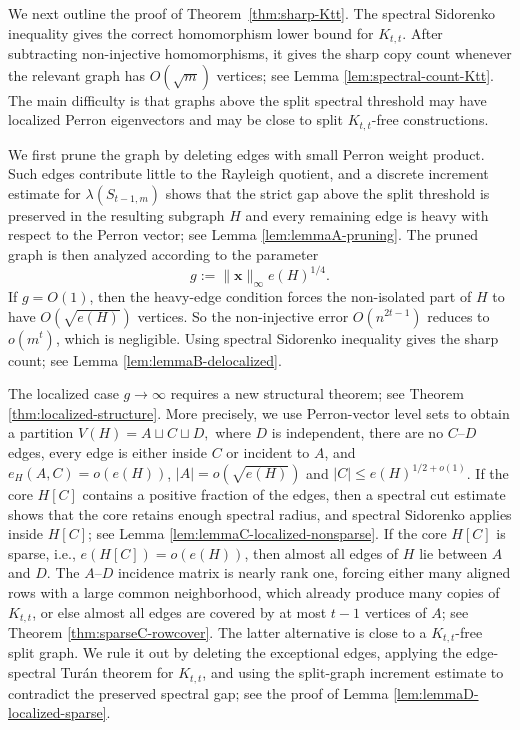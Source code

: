 \documentclass[11pt]{article}
\theoremstyle{definition}
\theoremstyle{plain}
\begin{document}
We next outline the proof of Theorem~\ref{thm:sharp-Ktt}.  The spectral
Sidorenko inequality gives the correct homomorphism lower bound for
\(K_{t,t}\).  After subtracting non-injective homomorphisms, it gives the
sharp copy count whenever the relevant graph has \(O(\sqrt m)\) vertices; see Lemma \ref{lem:spectral-count-Ktt}. 
The main difficulty is that graphs above the split spectral threshold may
have localized Perron eigenvectors and may be close to split
\(K_{t,t}\)-free constructions.

We first prune the graph by deleting edges with small Perron weight 
product.  Such edges contribute little to the Rayleigh quotient, and a
discrete increment estimate for \(\lambda(S_{t-1,m})\) shows that the
strict gap above the split threshold is preserved in the resulting subgraph \(H\) and every remaining edge is heavy with respect to the Perron vector; see Lemma \ref{lem:lemmaA-pruning}. The pruned graph is then analyzed according to the parameter 
\[
        g:=\|\bm{x}\|_\infty e(H)^{1/4}.
\]
If \(g=O(1)\), then the heavy-edge condition forces the non-isolated part of
\(H\) to have \(O(\sqrt{e(H)})\) vertices. So the non-injective error $O(n^{2t-1})$ reduces to  $o(m^t)$, which is
negligible. Using spectral Sidorenko inequality  gives the sharp count; see Lemma \ref{lem:lemmaB-delocalized}.

The localized case \(g\to\infty\) requires a new structural theorem; see Theorem \ref{thm:localized-structure}. More precisely, we use
Perron-vector level sets to obtain a partition
        $V(H)=A\sqcup C\sqcup D,$
where \(D\) is independent, there are no \(C\)--\(D\) edges, every edge
is either inside \(C\) or incident to \(A\), and
$e_H(A,C)=o(e(H))$, $|A|=o(\sqrt{e(H)})$ and 
$ |C|\le e(H)^{1/2+o(1)}$. 
If the core \(H[C]\) contains a positive fraction of the edges, then a spectral cut estimate shows that
the core retains enough spectral radius, and spectral Sidorenko applies
inside \(H[C]\); see Lemma \ref{lem:lemmaC-localized-nonsparse}.  
If the core $H[C]$ is sparse, i.e., $e(H[C])=o(e(H))$, 
then almost all edges of $H$ lie between
\(A\) and \(D\).  The \(A\)--\(D\) incidence matrix is nearly rank one,
forcing either many aligned rows with a large common neighborhood, which
already produce many copies of \(K_{t,t}\), or else almost all edges are
covered by at most \(t-1\) vertices of \(A\); see Theorem \ref{thm:sparseC-rowcover}. 
The latter alternative is
close to a \(K_{t,t}\)-free split graph.  We rule it out by deleting the
exceptional edges, applying the edge-spectral Tur\'an theorem for
\(K_{t,t}\), and using the split-graph increment estimate to contradict
the preserved spectral gap; see the proof of Lemma \ref{lem:lemmaD-localized-sparse}. 
\end{document}
